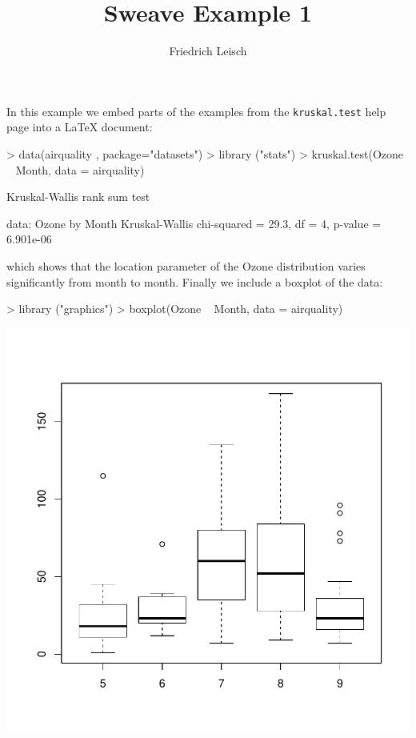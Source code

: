 \documentclass[a4paper]{article}
\title{Sweave Example 1}
\author{Friedrich Leisch}
\begin{document}

\maketitle
In this example we embed parts of the examples from the 
\texttt{kruskal.test} help page into a \LaTeX{} document:

\begin{Schunk}
\begin{Sinput}
> data(airquality , package="datasets")
> library ("stats")
> kruskal.test(Ozone ~ Month, data = airquality) 
\end{Sinput}
\begin{Soutput}
	Kruskal-Wallis rank sum test

data:  Ozone by Month
Kruskal-Wallis chi-squared = 29.3, df = 4, p-value = 6.901e-06
\end{Soutput}
\end{Schunk}

which shows that the location parameter of the Ozone distribution varies significantly from month to month. Finally we include a boxplot of the data:
\begin{center}
\begin{Schunk}
\begin{Sinput}
> library ("graphics")
> boxplot(Ozone ~ Month, data = airquality) 
\end{Sinput}
\end{Schunk}
\includegraphics{test-002}
\end{center}
\end{document}
